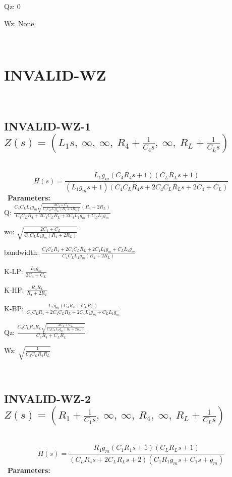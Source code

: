 \documentclass{article}
\begin{document}
Qz: $0$\ 

Wz: $\text{None}$\ 

\ 

\section{INVALID-WZ}\ 
\subsection{INVALID-WZ-1 $Z(s) = \left( L_{1} s, \  \infty, \  \infty, \  R_{4} + \frac{1}{C_{4} s}, \  \infty, \  R_{L} + \frac{1}{C_{L} s}\right)$ } \ 
\textbf{\[H(s) = \frac{L_{1} g_{m} \left(C_{4} R_{4} s + 1\right) \left(C_{L} R_{L} s + 1\right)}{\left(L_{1} g_{m} s + 1\right) \left(C_{4} C_{L} R_{4} s + 2 C_{4} C_{L} R_{L} s + 2 C_{4} + C_{L}\right)}\] } \ 
\textbf{Parameters:}\\ 

Q: $\frac{C_{4} C_{L} L_{1} g_{m} \sqrt{\frac{2 C_{4} + C_{L}}{C_{4} C_{L} L_{1} g_{m} \left(R_{4} + 2 R_{L}\right)}} \left(R_{4} + 2 R_{L}\right)}{C_{4} C_{L} R_{4} + 2 C_{4} C_{L} R_{L} + 2 C_{4} L_{1} g_{m} + C_{L} L_{1} g_{m}}$\ 

wo: $\sqrt{\frac{2 C_{4} + C_{L}}{C_{4} C_{L} L_{1} g_{m} \left(R_{4} + 2 R_{L}\right)}}$\ 

bandwidth: $\frac{C_{4} C_{L} R_{4} + 2 C_{4} C_{L} R_{L} + 2 C_{4} L_{1} g_{m} + C_{L} L_{1} g_{m}}{C_{4} C_{L} L_{1} g_{m} \left(R_{4} + 2 R_{L}\right)}$\ 

K-LP: $\frac{L_{1} g_{m}}{2 C_{4} + C_{L}}$\ 

K-HP: $\frac{R_{4} R_{L}}{R_{4} + 2 R_{L}}$\ 

K-BP: $\frac{L_{1} g_{m} \left(C_{4} R_{4} + C_{L} R_{L}\right)}{C_{4} C_{L} R_{4} + 2 C_{4} C_{L} R_{L} + 2 C_{4} L_{1} g_{m} + C_{L} L_{1} g_{m}}$\ 

Qz: $\frac{C_{4} C_{L} R_{4} R_{L} \sqrt{\frac{2 C_{4} + C_{L}}{C_{4} C_{L} L_{1} g_{m} \left(R_{4} + 2 R_{L}\right)}}}{C_{4} R_{4} + C_{L} R_{L}}$\ 

Wz: $\sqrt{\frac{1}{C_{4} C_{L} R_{4} R_{L}}}$\ 

\ 

\subsection{INVALID-WZ-2 $Z(s) = \left( R_{1} + \frac{1}{C_{1} s}, \  \infty, \  \infty, \  R_{4}, \  \infty, \  R_{L} + \frac{1}{C_{L} s}\right)$ } \ 
\textbf{\[H(s) = \frac{R_{4} g_{m} \left(C_{1} R_{1} s + 1\right) \left(C_{L} R_{L} s + 1\right)}{\left(C_{L} R_{4} s + 2 C_{L} R_{L} s + 2\right) \left(C_{1} R_{1} g_{m} s + C_{1} s + g_{m}\right)}\] } \ 
\textbf{Parameters:}\\ 
\end{document}
